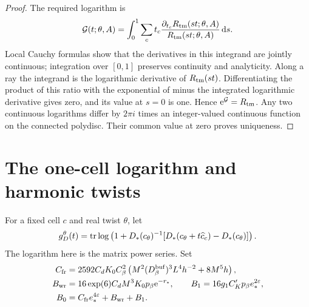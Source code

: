 \begin{proof}
The required logarithm is
\begin{equation}\label{eq:interacting-logarithm}
 \mathcal G(t;\theta,A)=
 \int_0^1\sum_ct_c
       \frac{\partial_{t_c}R_{\rm tm}(st;\theta,A)}
            {R_{\rm tm}(st;\theta,A)}\,\mathrm d s .
\end{equation}
Local Cauchy formulas show that the derivatives
in this integrand are jointly continuous;
integration over $[0,1]$ preserves continuity
and analyticity. Along a ray the integrand is
the logarithmic derivative of $R_{\rm tm}(st)$.
Differentiating the product of this ratio with
the exponential of minus the integrated
logarithmic derivative gives zero, and its
value at $s=0$ is one. Hence
$\mathrm e^{\mathcal G}=R_{\rm tm}$.
Any two continuous logarithms differ by
$2\pi i$ times an integer-valued continuous
function on the connected polydisc. Their
common value at zero proves uniqueness.
\end{proof}

\section{The one-cell logarithm and harmonic twists}
\label{subsec:interacting-one-cell}

For a fixed cell $c$ and real twist $\theta$, let
\begin{equation}\label{eq:interacting-free-coarse-log}
 g_D^\theta(t)=\operatorname{tr}\log\left(1+D_*(c_\theta)^{-1}
                   [D_*(c_\theta+t\widehat c_c)-D_*(c_\theta)]\right).
\end{equation}
The logarithm here is the matrix power series.
Set
\begin{align}
 C_{\rm fr}&=2592C_dK_0C_\beta^2
       \left(M^2(D_\beta^{\rm buf})^3L^4h^{-2}+8M^5h\right),
                                                   \notag\\
 B_{\rm wr}&=16\exp(6)C_dM^3K_0p_\beta \mathrm e^{-r_*},
 \qquad B_1=16g_1C_K'p_\beta e_*^{2\varepsilon},       \notag\\
 B_0&=C_{\rm fr}e_*^{4\varepsilon}+B_{\rm wr}+B_1 .
                                \label{eq:interacting-free-log-constants}
\end{align}

